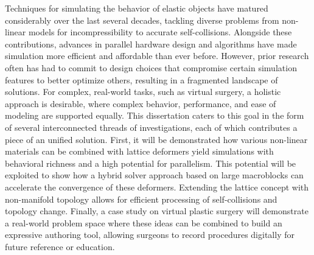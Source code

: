
Techniques for simulating the behavior of elastic objects have matured
considerably over the last several decades, tackling diverse problems
from non-linear models for incompressibility to accurate
self-collisions. Alongside these contributions, advances in parallel
hardware design and algorithms have made simulation more efficient and
affordable than ever before. However, prior research often has had to
commit to design choices that compromise certain simulation features
to better optimize others, resulting in a fragmented landscape of
solutions. For complex, real-world tasks, such as virtual surgery, a
holistic approach is desirable, where complex behavior, performance,
and ease of modeling are supported equally. This dissertation caters
to this goal in the form of several interconnected threads of
investigations, each of which contributes a piece of an unified
solution. First, it will be demonstrated how various non-linear
materials can be combined with lattice deformers yield simulations
with behavioral richness and a high potential for parallelism. This
potential will be exploited to show how a hybrid solver approach based
on large macroblocks can accelerate the convergence of these
deformers. Extending the lattice concept with non-manifold topology
allows for efficient processing of self-collisions and topology
change. Finally, a case study on virtual plastic surgery will
demonstrate a real-world problem space where these ideas can be
combined to build an expressive authoring tool, allowing surgeons to
record procedures digitally for future reference or education.


